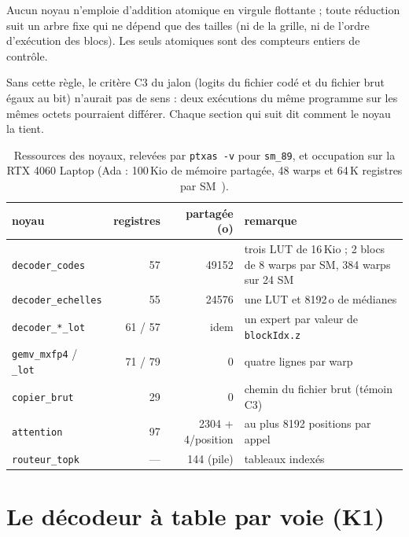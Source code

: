 \begin{definition}\label{def:t2n-determinisme}
Aucun noyau n'emploie d'addition atomique en virgule flottante ; toute réduction suit un arbre fixe qui ne dépend que des tailles (ni de la grille, ni de l'ordre d'exécution des blocs). Les seuls atomiques sont des compteurs entiers de contrôle.
\end{definition}

Sans cette règle, le critère C3 du jalon (logits du fichier codé et du fichier brut égaux au bit) n'aurait pas de sens : deux exécutions du même programme sur les mêmes octets pourraient différer. Chaque section qui suit dit comment le noyau la tient.

\begin{table}[!htbp]
\centering\small
\caption[Ressources des noyaux sur Ada]{Ressources des noyaux, relevées par \texttt{ptxas -v} pour \texttt{sm\_89}, et occupation sur la RTX 4060 Laptop (Ada : 100\,Kio de mémoire partagée, 48 warps et 64\,K registres par SM~\cite{nvidia2026adatuning}).}
\label{tab:t2n-ressources}
\begin{tabularx}{\linewidth}{@{}lrrX@{}}
\toprule
noyau & registres & partagée (o) & remarque \\
\midrule
\texttt{decoder\_codes} & 57 & \num{49152} & trois LUT de 16\,Kio ; 2 blocs de 8 warps par SM, 384 warps sur 24 SM \\
\texttt{decoder\_echelles} & 55 & \num{24576} & une LUT et \num{8192}\,o de médianes \\
\texttt{decoder\_*\_lot} & 61 / 57 & idem & un expert par valeur de \texttt{blockIdx.z} \\
\texttt{gemv\_mxfp4} / \texttt{\_lot} & 71 / 79 & 0 & quatre lignes par warp \\
\texttt{copier\_brut} & 29 & 0 & chemin du fichier brut (témoin C3) \\
\texttt{attention} & 97 & \num{2304} + 4/position & au plus \num{8192} positions par appel \\
\texttt{routeur\_topk} & — & 144 (pile) & tableaux indexés \\
\bottomrule
\end{tabularx}
\end{table}

\section{Le décodeur à table par voie (K1)}\label{sec:t2n-decodeur}

